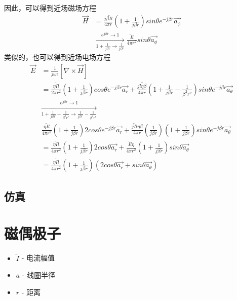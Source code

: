 \documentclass[lang=cn,11pt]{elegantpaper}
\begin{document}
因此，可以得到近场磁场方程
\begin{equation}
  \begin{aligned}
    \vec{H} &= \frac{j\beta \widetilde{I}l}{4\pi r}\left(1 + \frac{1}{j\beta r}\right)sin \theta {} e^{-j\beta r} \vec{a_{\phi}} \\
    &\xrightarrow[1 + \frac{1}{j\beta r}\rightarrow \frac{1}{j\beta r}]{e^{j\beta r}\rightarrow 1} \frac{\widetilde{I}l}{4\pi r^2}sin \theta \vec{a_{\phi}} 
  \end{aligned}
\end{equation}
类似的，也可以得到近场电场方程
\begin{equation}
  \begin{aligned}
    \vec{E} &= \frac{1}{j\omega \epsilon}\left[\nabla \times \vec{H}\right] \\
    &= \frac{\eta \widetilde{I}l}{2\pi r^2}\left(1 + \frac{1}{j\beta r} \right)cos\theta e^{-j\beta r}\vec{a_r}+\frac{j\widetilde{l\eta \beta}}{4\pi r}\left(1+\frac{1}{j\beta r} - \frac{1}{{\beta}^2r^2}\right)sin\theta e^{-j\beta r}\vec{a_{\theta}} \\
    &\xrightarrow[1 + \frac{1}{j\beta r} -\frac{1}{{\beta}^2r^r}\rightarrow \frac{1}{j\beta r}-\frac{1}{{\beta}^2r^r}]{e^{j\beta r}\rightarrow 1} \\
    & \frac{\eta \widetilde{I}l}{4\pi r^2}\left(1+\frac{1}{j\beta r}\right)2cos\theta e^{-j\beta r}\vec{a_r}+\frac{j\widetilde{I}l\eta \beta}{4\pi r}\left(\frac{1}{j\beta r}\right)\left( 1+\frac{1}{j\beta r}\right)sin\theta e^{-j\beta r}\vec{a_{\theta}}\\
    &= \frac{\eta \widetilde{I}l}{4\pi r^2}\left(1+\frac{1}{j\beta r}\right)2cos\theta \vec{a_r} +\frac{\widetilde{I}l\eta}{4\pi r^2}\left( 1+\frac{1}{j\beta r}\right)sin\theta \vec{a_{\theta}} \\
    &= \frac{\eta \widetilde{I}l}{4\pi r^2}\left(1+\frac{1}{j\beta r}\right)\left(2cos\theta \vec{a_r} + sin\theta \vec{a_{\theta}}\right)
  \end{aligned}
\end{equation}

\subsection{仿真}

\section{磁偶极子}
\begin{itemize}
  \item $\widetilde{I}$ - 电流幅值
  \item $a$ - 线圈半径
  \item $r$ - 距离
\end{itemize}
\end{document}
